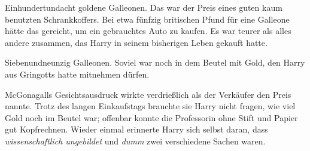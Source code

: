 Einhundertundacht goldene Galleonen. Das war der Preis eines guten kaum benutzten Schrankkoffers. Bei etwa fünfzig britischen Pfund für eine Galleone hätte das gereicht, um ein gebrauchtes Auto zu kaufen. Es war teurer als alles andere zusammen, das Harry in seinem bisherigen Leben gekauft hatte.

Siebenundneunzig Galleonen. Soviel war noch in dem Beutel mit Gold, den Harry aus Gringotts hatte mitnehmen dürfen.

McGonagalls Gesichtsausdruck wirkte verdrießlich als der Verkäufer den Preis nannte. Trotz des langen Einkaufstags brauchte sie Harry nicht fragen, wie viel Gold noch im Beutel war; offenbar konnte die Professorin ohne Stift und Papier gut Kopfrechnen. Wieder einmal erinnerte Harry sich selbst daran, dass \emph{wissenschaftlich ungebildet} und \emph{dumm} zwei verschiedene Sachen waren.

